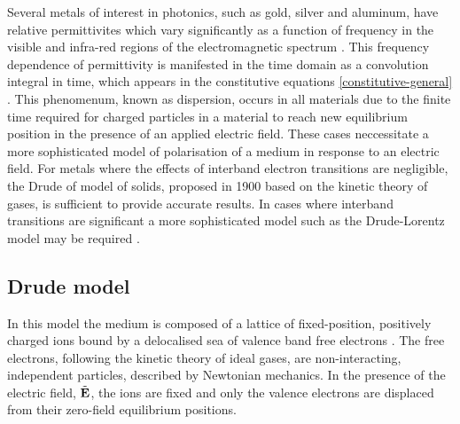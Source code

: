 Several metals of interest in photonics, such as gold, silver and aluminum, have relative permittivites which vary significantly as a function of frequency in the visible and infra-red regions of the electromagnetic spectrum \cite{Ordal:1983bg}.
This frequency dependence of permittivity is manifested in the time domain as a convolution integral in time, which appears in the constitutive equations \eqref{constitutive-general} \cite{Jackson:490457}.
This phenomenum, known as dispersion, occurs in all materials due to the finite time required for charged particles in a material to reach new equilibrium position in the presence of an applied electric field.
These cases neccessitate a more sophisticated model of polarisation of a medium in response to an electric field. For metals where the effects of interband electron transitions are negligible, the Drude of model of solids, proposed in 1900 \cite{Drude:1900hg} based on the kinetic theory of gases, is sufficient to provide accurate results. In cases where interband transitions are significant a more sophisticated model such as the Drude-Lorentz model may be required \cite{Fox:2001wm,Taflove:1989ds}.

\subsection{Drude model}
\label{sub:The Drude Model}

In this model the medium is composed of a lattice of fixed-position, positively charged ions bound by a delocalised sea of valence band free electrons \cite{Ashcroft:2005wp,Bandyopadhyay:1503732}. The free electrons, following the kinetic theory of ideal gases, are non-interacting, independent particles, described by Newtonian mechanics. In the presence of the electric field, $\tilde{\mathbf{E}}$, the ions are fixed and only the valence electrons are displaced from their zero-field equilibrium positions.
%


